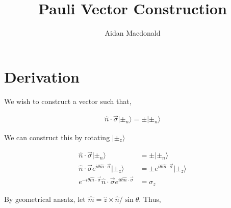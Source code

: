 \documentclass[10pt,a4paper,final]{article}
\author{Aidan Macdonald}
\title{Pauli Vector Construction}
\begin{document}
\maketitle

\section{Derivation}

We wish to construct a vector such that,

\begin{align*}
\hat{n} \cdot \vec{\sigma} |\pm_n \rangle = \pm |\pm_n \rangle 
\end{align*}

We can construct this by rotating $ |\pm_z \rangle $

\begin{align*}
\hat{n} \cdot \vec{\sigma} |\pm_n \rangle &= \pm |\pm_n \rangle \\
\hat{n} \cdot \vec{\sigma} e^{i \theta \hat{m} \cdot \vec{\sigma} }|\pm_z \rangle &= \pm e^{i \theta \hat{m} \cdot \vec{\sigma} } |\pm_z \rangle \\
e^{-i \theta \hat{m} \cdot \vec{\sigma} } \hat{n} \cdot \vec{\sigma} e^{i \theta \hat{m} \cdot \vec{\sigma} } &= \sigma_z
\end{align*}

By geometrical ansatz, let $ \hat{m} = \hat{z} \times \hat{n}/\sin \theta $. Thus,
\end{document}
